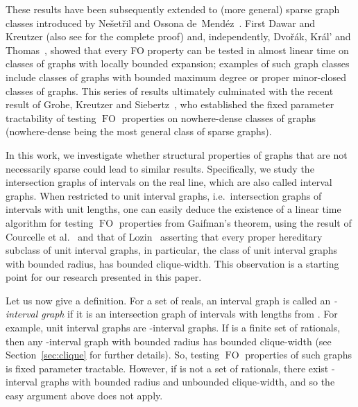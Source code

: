 \documentclass{CSML}
\newcommand{\FO}{\ensuremath{\operatorname{FO}}\xspace}
\theoremstyle{plain}\newtheorem{claim}[thm]{Claim}
\begin{document}
These results have been subsequently extended to (more general) sparse graph classes
introduced by Ne\v{s}et\v{r}il and Ossona de~Mend\'ez~\cite{no08i,no08ii,no08iii}. First Dawar and Kreutzer \cite{dk09}
(also see \cite{gk11} for the complete proof) and, independently,
Dvo\v{r}\'ak, Kr\'al' and Thomas~\cite{dkt10}, showed that every
FO property can be tested in almost linear time on classes of
graphs with locally bounded expansion; examples of such graph classes
include classes of graphs with bounded maximum degree or proper minor-closed
classes of graphs. This series of results ultimately culminated with the recent result of Grohe, Kreutzer and
Siebertz~\cite{GKS14}, who established the fixed parameter tractability of
testing \FO properties on nowhere-dense classes of graphs (nowhere-dense
being the most general class of sparse graphs).

In this work, we investigate whether structural properties of graphs that are not necessarily sparse could lead to similar results.
Specifically, we study the intersection graphs of intervals on the real line,
which are also called interval graphs. 
When restricted to unit interval graphs,
i.e.~intersection graphs of intervals with unit lengths,
one can easily deduce the existence of a linear time algorithm
for testing \FO properties from Gaifman's theorem, using the result of Courcelle et al.~\cite{cmr00} and
that of Lozin~\cite{loz08} asserting that every proper hereditary subclass of
unit interval graphs, in particular, the class of unit interval graphs
with bounded radius, has bounded clique-width.
This observation is a starting point for our research presented
in this paper.

Let us now give a definition. For a set  of reals,
an interval graph is called an {\em-interval graph} if it is an intersection
graph of intervals with lengths from . For example, unit interval graphs
are -interval graphs.
If  is a finite set of rationals, then any -interval graph
with bounded radius has bounded clique-width (see Section~\ref{sec:clique} for further details).
So, testing \FO properties of such graphs is fixed parameter tractable.
However, if  is not a set of rationals, there exist -interval graphs
with bounded radius and unbounded clique-width, 
and so the easy argument above does not apply.
\end{document}
